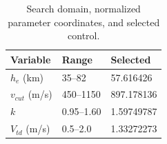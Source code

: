 \begin{table}[htbp]
\centering\small
\caption{Search domain, normalized parameter coordinates, and selected control.}
\label{tab:search_domain}
\begin{tabularx}{\linewidth}{@{}lXX@{}}
\toprule
Variable & Range & Selected \\
\midrule
$h_e$ (km) & 35--82 & 57.616426 \\
$v_{cut}$ (m/s) & 450--1150 & 897.178136 \\
$k$ & 0.95--1.60 & 1.59749787 \\
$V_{td}$ (m/s) & 0.5--2.0 & 1.33272273 \\
\bottomrule
\end{tabularx}
\par{}
\end{table}
